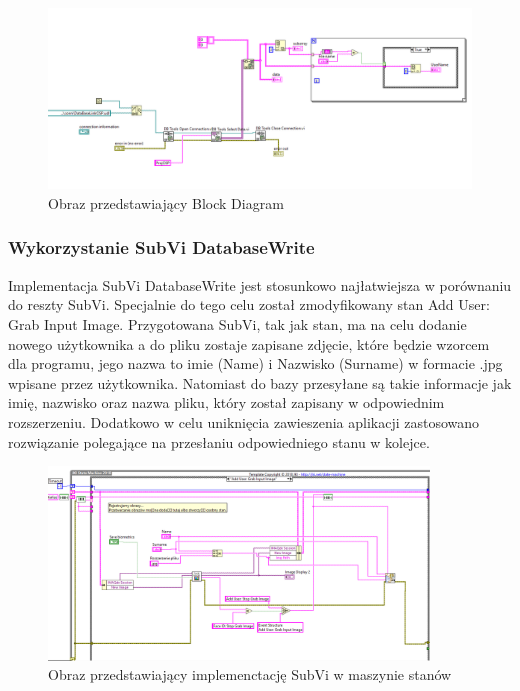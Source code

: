 \documentclass{report}
\begin{document}
\begin{figure}[H]
    \centering
    \includegraphics[width=1.0\textwidth]{src/Database/Database_read_subvi.png}
    \caption{Obraz przedstawiający Block Diagram }
    \label{fig:first-att}
\end{figure}

\subsubsection{\large Wykorzystanie SubVi DatabaseWrite}

Implementacja SubVi DatabaseWrite jest stosunkowo najłatwiejsza w porównaniu do reszty SubVi. Specjalnie do tego celu został zmodyfikowany stan Add User: Grab Input Image.
Przygotowana SubVi, tak jak stan, ma na celu dodanie nowego użytkownika a do pliku zostaje zapisane zdjęcie, które będzie wzorcem dla programu, jego nazwa to imie (Name) i Nazwisko (Surname) w formacie .jpg
wpisane przez użytkownika. Natomiast do bazy przesyłane są takie informacje jak imię, nazwisko oraz nazwa pliku, który został zapisany w odpowiednim rozszerzeniu.
Dodatkowo w celu uniknięcia zawieszenia aplikacji zastosowano rozwiązanie polegające na przesłaniu odpowiedniego stanu w kolejce. 

\begin{figure}[H]
    \centering
    \includegraphics[width=0.9\textwidth]{src/Database/Database_write.png}
    \caption{Obraz przedstawiający implemenctację SubVi w maszynie stanów}
    \label{fig:first-att}
\end{figure}
\end{document}
